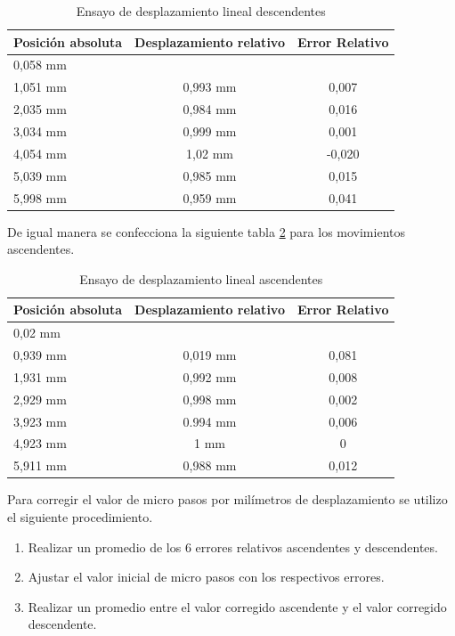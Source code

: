 \begin{table}[h]
	\centering
	\caption[Ensayo de desplazamiento]{Ensayo de desplazamiento lineal descendentes}
	\begin{tabular}{l c c }    
		\toprule
		\textbf{Posición absoluta}     & \textbf{Desplazamiento relativo} & \textbf{Error Relativo} \\
		\midrule
		0,058 mm	& 	        	& 	 			 	\\		
		1,051 mm    & 	0,993 mm    	& 	0,007				\\
		2,035 mm 	& 	0,984 mm	    & 	0,016 				\\
		3,034 mm	& 	0,999 mm	    & 	0,001 			\\
		4,054 mm 	& 	1,02 mm         & 	-0,020					\\
		5,039 mm 	& 	0,985 mm	    & 	0,015					\\
		5,998 mm 	& 	0,959 mm        & 	0,041 			\\
		\bottomrule
		\hline
	\end{tabular}
	\label{tab:ensayo_desplazamiento_des}
\end{table}

De igual manera se confecciona la siguiente tabla \ref{tab:ensayo_desplazamiento_asc} para los movimientos ascendentes.
 
\begin{table}[h]
	\centering
	\caption[Ensayo de desplazamiento]{Ensayo de desplazamiento lineal ascendentes}
	\begin{tabular}{l c c }    
		\toprule
		\textbf{Posición absoluta}     & \textbf{Desplazamiento relativo} & \textbf{Error Relativo} \\
		\midrule
		0,02 mm	& 	        	& 	 			 	\\		
		0,939 mm    & 	0,019 mm    	& 	0,081	\\
		1,931 mm 	& 	0,992 mm	    & 	0,008 	\\
		2,929 mm	& 	0,998 mm	    & 	0,002 	\\
		3,923 mm 	& 	0.994 mm        & 	0,006	\\
		4,923 mm 	& 	1 mm	    	& 	0		\\
		5,911 mm 	& 	0,988 mm        & 	0,012 	\\
		\bottomrule
		\hline
	\end{tabular}
	\label{tab:ensayo_desplazamiento_asc}
\end{table}


Para corregir el valor de micro pasos por milímetros de desplazamiento se utilizo el siguiente procedimiento.
\begin{enumerate}
\item Realizar un promedio de los 6 errores relativos ascendentes y descendentes.
\item Ajustar el valor inicial de micro pasos con los respectivos errores. 
\item Realizar un promedio entre el valor corregido ascendente y el valor corregido descendente.
\end{enumerate}


